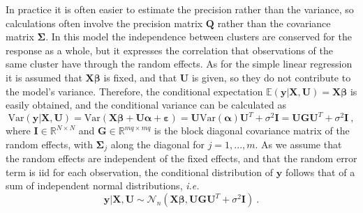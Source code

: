 In practice it is often easier to estimate the precision rather than the variance, so calculations often involve the precision matrix $\mathbf{Q}$ rather than the covariance matrix $\mathbf{\Sigma}$.
In this model the independence between clusters are conserved for the response as a whole, but it expresses the correlation that observations of the same cluster have through the random effects.
As for the simple linear regression it is assumed that $\mathbf{X}\boldsymbol{\beta}$ is fixed, and that $\mathbf{U}$ is given, so they do not contribute to the model's variance. Therefore, the conditional expectation $\mathbb{E}(\mathbf{y} \lvert \mathbf{X}, \mathbf{U}) = \mathbf{X}\boldsymbol{\beta}$ is easily obtained, and the conditional variance can be calculated as
\begin{equation} \label{eq:cond_var_LMM}
    \text{Var}(\mathbf{y} \lvert \mathbf{X}, \mathbf{U}) = \text{Var}(\mathbf{X}\boldsymbol{\beta}  + \mathbf{U}\boldsymbol{\alpha} + \boldsymbol{\varepsilon}) = \mathbf{U}\text{Var}(\boldsymbol{\alpha})\mathbf{U}^T + \sigma^2\mathbf{I} = \mathbf{U}\mathbf{G}\mathbf{U}^T + \sigma^2\mathbf{I} \ ,
\end{equation}
where $\mathbf{I}\in \mathbb{R}^{N\times N}$ and $\mathbf{G} \in \mathbb{R}^{mq \times mq}$ is the block diagonal covariance matrix of the random effects, with $\mathbf{\Sigma}_j$ along the diagonal for $j=1, ..., m$. 
As we assume that the random effects are independent of the fixed effects, and that the random error term is iid for each observation, the conditional distribution of $\mathbf{y}$ follows that of a sum of independent normal distributions, \textit{i.e.}
\begin{equation}
    \mathbf{y} \lvert \mathbf{X}, \mathbf{U} \sim \mathcal{N}_n(\mathbf{X}\boldsymbol{\beta}, \mathbf{U}\mathbf{G}\mathbf{U}^T + \sigma^2\mathbf{I}) \ .
\end{equation}


